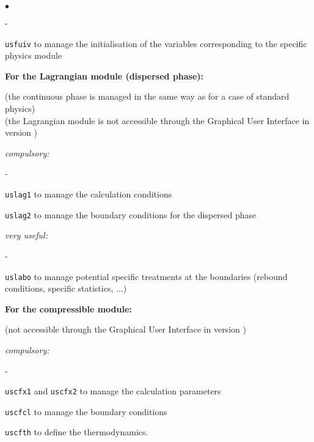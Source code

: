 {{{\begin{list}{$\bullet$}{}
\begin{list}{}{}
\begin{list}{}{}
\begin{list}{-}{}
            \item \texttt{usfuiv} to manage the initialisation of the
                   variables corresponding to the specific physics module
        \end{list}
    \end{list}


    \item{\bf For the Lagrangian module (dispersed phase):}

(the continuous phase is managed in the same way as for a case of standard
physics)\\
(the Lagrangian module is not accessible through the Graphical User Interface in
version \verscs)
    \begin{list}{}{}
        \item {\em compulsory:}
        \begin{list}{-}{}
            \item \texttt{uslag1} to manage the calculation conditions

            \item \texttt{uslag2} to manage the boundary conditions for the
             dispersed phase

        \end{list}

        \item {\em very useful:}
        \begin{list}{-}{}
                \item \texttt{uslabo} to manage potential specific treatments at the
             boundaries (rebound conditions, specific statistics, ...)
        \end{list}
    \end{list}

   \item {\bf For the compressible module:}

(not accessible through the Graphical User Interface in version \verscs)
    \begin{list}{}{}
        \item {\em compulsory:}
        \begin{list}{-}{}
            \item \texttt{uscfx1} and \texttt{uscfx2} to manage the
                  calculation parameters

            \item \texttt{uscfcl} to manage the boundary conditions

            \item \texttt{uscfth} to define the thermodynamics.
        \end{list}


\end{list}
\end{list}
\end{list}}}}

